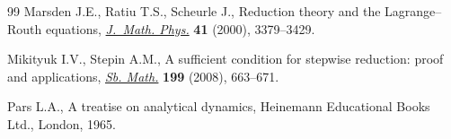 \documentclass[11pt]{article}
\begin{document}
\begin{thebibliography}{99}
 Marsden J.E., Ratiu T.S., Scheurle J.,
Reduction theory and the Lagrange--Routh equations,
\href{http://dx.doi.org/10.1063/1.533317}{{\em J.~Math. Phys.}} {\bf  41} (2000), 3379--3429.

 Mikityuk I.V., Stepin A.M.,
A suf\/f\/icient condition for stepwise reduction: proof and applications,
\href{http://dx.doi.org/10.1070/SM2008v199n05ABEH003938}{{\em Sb. Math.}} {\bf 199} (2008),  663--671.

 Pars L.A.,
A treatise on analytical dynamics,
Heinemann Educational Books Ltd., London, 1965.

\end{thebibliography}
\end{document}
